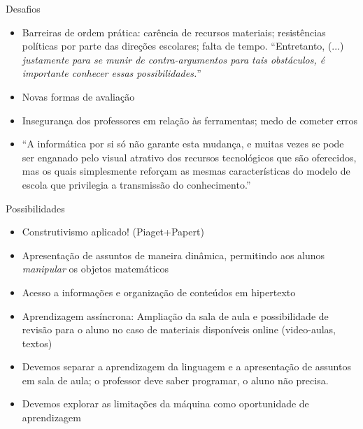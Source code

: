 \documentclass[10pt,]{beamer}
\begin{document}

\begin{frame}{Desafios}
  \begin{itemize}
  \item Barreiras de ordem prática: carência de recursos materiais; resistências políticas por parte das direções escolares; falta de tempo. ``Entretanto, (...) \emph{justamente para se munir de contra-argumentos para tais obstáculos, é importante conhecer essas possibilidades.}'' \cite[p.VII]{profmat2013}
  \item Novas formas de avaliação
  \item Insegurança dos professores em relação às ferramentas; medo de cometer erros
  \item ``A informática por si só não garante esta mudança, e muitas vezes se pode ser enganado pelo visual atrativo dos recursos tecnológicos que são oferecidos, mas os quais simplesmente reforçam as mesmas características do modelo de escola que privilegia a transmissão do conhecimento.'' \cite{gravina}
  \end{itemize}
\end{frame}

\begin{frame}{Possibilidades}
  \begin{itemize}
  \item Construtivismo aplicado! (Piaget+Papert)
  \item Apresentação de assuntos de maneira dinâmica, permitindo aos alunos \emph{manipular} os objetos matemáticos
  \item Acesso a informações e organização de conteúdos em hipertexto
  \item Aprendizagem assíncrona: Ampliação da sala de aula e possibilidade de revisão para o aluno no caso de materiais disponíveis online (video-aulas, textos)
  \item Devemos separar a aprendizagem da linguagem e a apresentação de assuntos em sala de aula; o professor deve saber programar, o aluno não precisa.
  \item Devemos explorar as limitações da máquina como oportunidade de aprendizagem
  \end{itemize}
\end{frame}
  
\end{document}
